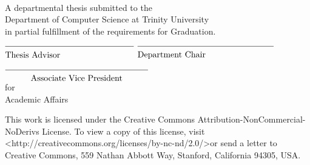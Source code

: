 \begin{center}

\vfill

\textbf{\theTitle} %

\theAuthor \\

\vspace*{\baselineskip}

A departmental thesis submitted to the \\
Department of Computer Science at Trinity University \\
in partial fulfillment of the requirements for Graduation.\\

\vspace*{\baselineskip}

\theDate

\vfill

$\overline{\mbox{\rule{0in}{0.16in}Thesis Advisor~~~~~~~~~~~~~~~~~~~~~~~~~~}}$ 
\hfill
$\overline{\mbox{\rule{0in}{0.16in}Department Chair~~~~~~~~~~~~~~~~~~~~~~~~}}$ 

\vspace{1.0in}

$\overline{\mbox{\rule{0in}{0.16in}
~~~~~~~~Associate Vice President~~~~~~~~
}}$ \\
for \\
Academic Affairs

\vfill

\hfill
\hfill
\hfill

\begin{tiny}
This work is licensed under the Creative Commons Attribution-NonCommercial-NoDerivs License.  To view a copy of this license, visit \textless http://creativecommons.org/licenses/by-nc-nd/2.0/\textgreater or send a letter to Creative Commons, 559 Nathan Abbott Way, Stanford, California 94305, USA.
\end{tiny}


\end{center}
